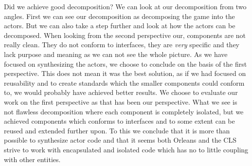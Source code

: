 Did we achieve good decomposition? We can look at our decomposition from two angles. First we can see our decomposition as decomposing the game into the actors. But we can also take a step further and look at how the actors can be decomposed. When looking from the second perspective our, components are not really clean. They do not conform to interfaces, they are \textit{very} specific and they lack purpose and meaning as we can not see the whole picture. As we have focused on synthesizing the actors, we choose to conclude on the basis of the first perspective. This does not mean it was the best solution, as if we had focused on reusability and to create standards which the smaller components could conform to, we would probably have achieved better results. We choose to evaluate our work on the first perspective as that has been our perspective. What we see is not flawless decomposition where each component is completely isolated, but we achieved components which conforms to interfaces and to some extent can be reused and extended further upon. To this we conclude that it is more than possible to synthesize actor code and that it seems both Orleans and the CLS strive to work with encapsulated and isolated code which has no to little coupling with other entities.

